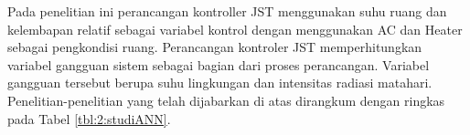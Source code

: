 

Pada penelitian ini perancangan kontroller JST menggunakan suhu ruang dan kelembapan relatif sebagai variabel kontrol dengan menggunakan AC dan Heater sebagai pengkondisi ruang. Perancangan kontroler JST memperhitungkan variabel gangguan sistem sebagai bagian dari proses perancangan. Variabel gangguan tersebut berupa suhu lingkungan dan intensitas radiasi matahari. Penelitian-penelitian yang telah dijabarkan di atas dirangkum dengan ringkas pada Tabel \ref{tbl:2:studiANN}.

